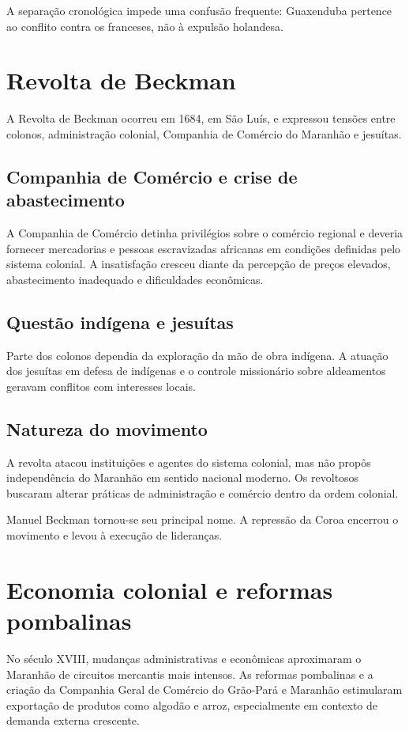 A separação cronológica impede uma confusão frequente: Guaxenduba pertence ao conflito contra os franceses, não à expulsão holandesa.

\section{Revolta de Beckman}

A Revolta de Beckman ocorreu em 1684, em São Luís, e expressou tensões entre colonos, administração colonial, Companhia de Comércio do Maranhão e jesuítas.

\subsection{Companhia de Comércio e crise de abastecimento}

A Companhia de Comércio detinha privilégios sobre o comércio regional e deveria fornecer mercadorias e pessoas escravizadas africanas em condições definidas pelo sistema colonial. A insatisfação cresceu diante da percepção de preços elevados, abastecimento inadequado e dificuldades econômicas.

\subsection{Questão indígena e jesuítas}

Parte dos colonos dependia da exploração da mão de obra indígena. A atuação dos jesuítas em defesa de indígenas e o controle missionário sobre aldeamentos geravam conflitos com interesses locais.

\subsection{Natureza do movimento}

A revolta atacou instituições e agentes do sistema colonial, mas não propôs independência do Maranhão em sentido nacional moderno. Os revoltosos buscaram alterar práticas de administração e comércio dentro da ordem colonial.

Manuel Beckman tornou-se seu principal nome. A repressão da Coroa encerrou o movimento e levou à execução de lideranças.

\section{Economia colonial e reformas pombalinas}

No século XVIII, mudanças administrativas e econômicas aproximaram o Maranhão de circuitos mercantis mais intensos. As reformas pombalinas e a criação da Companhia Geral de Comércio do Grão-Pará e Maranhão estimularam exportação de produtos como algodão e arroz, especialmente em contexto de demanda externa crescente.

